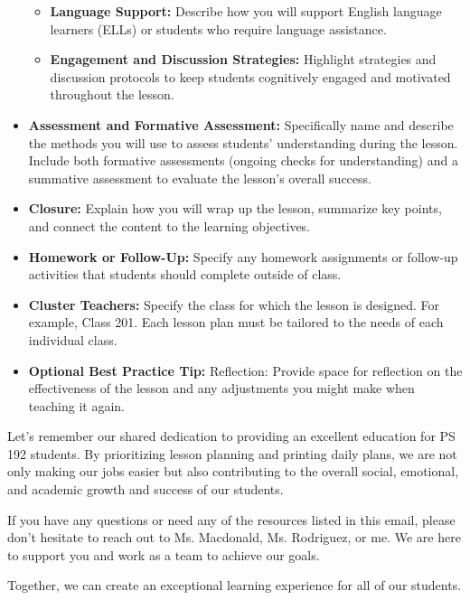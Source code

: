 \documentclass[11pt]{article}
\begin{document}
\begin{itemize}
\begin{itemize}
\item \textbf{\textbf{Language Support:}} Describe how you will support English language learners (ELLs) or students who require language assistance.

\item \textbf{\textbf{Engagement and Discussion Strategies:}} Highlight strategies and discussion protocols to keep students cognitively engaged and motivated throughout the lesson.
\end{itemize}

\item \textbf{\textbf{Assessment and Formative Assessment:}} Specifically name and describe the methods you will use to assess students’ understanding during the lesson. Include both formative assessments (ongoing checks for understanding) and a summative assessment to evaluate the lesson’s overall success.

\item \textbf{\textbf{Closure:}} Explain how you will wrap up the lesson, summarize key points, and connect the content to the learning objectives.

\item \textbf{\textbf{Homework or Follow-Up:}} Specify any homework assignments or follow-up activities that students should complete outside of class.

\item \textbf{\textbf{Cluster Teachers:}} Specify the class for which the lesson is designed. For example, Class 201. Each lesson plan must be tailored to the needs of each individual class.

\item \textbf{\textbf{Optional Best Practice Tip:}} Reflection: Provide space for reflection on the effectiveness of the lesson and any adjustments you might make when teaching it again.
\end{itemize}

Let’s remember our shared dedication to providing an excellent education for PS 192 students. By prioritizing lesson planning and printing daily plans, we are not only making our jobs easier but also contributing to the overall social, emotional, and academic growth and success of our students.

If you have any questions or need any of the resources listed in this email, please don’t hesitate to reach out to Ms. Macdonald, Ms. Rodriguez, or me. We are here to support you and work as a team to achieve our goals.

Together, we can create an exceptional learning experience for all of our students.
\end{document}
